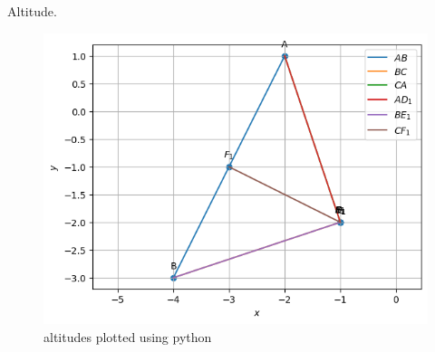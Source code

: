 \begin{table}[H]
        \centering
        
        \caption{Altitude.}
        \label{tab:Altitude}
    \end{table}
\begin{figure}[H]
\includegraphics[width=\columnwidth]{1-3/figs/altitude.png}
\caption{altitudes plotted using python}
\label{fig:i_altitude_py}
\end{figure}
